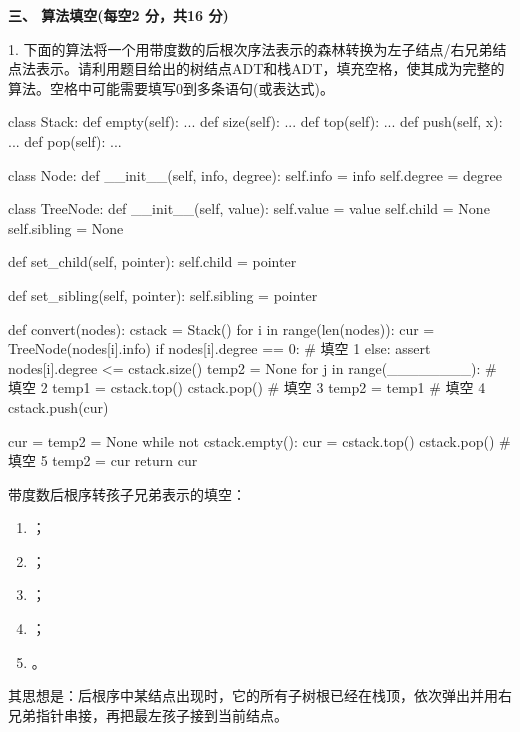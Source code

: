 \textbf{三、 算法填空(每空2 分，共16 分)}
\begin{question}
1. 下面的算法将一个用带度数的后根次序法表示的森林转换为左子结点/右兄弟结点法表示。请利用题目给出的树结点ADT和栈ADT，填充空格，使其成为完整的算法。空格中可能需要填写0到多条语句(或表达式)。
\begin{pycode}
class Stack:
    def empty(self): ...
    def size(self): ...
    def top(self): ...
    def push(self, x): ...
    def pop(self): ...


class Node:
    def __init__(self, info, degree):
        self.info = info
        self.degree = degree


class TreeNode:
    def __init__(self, value):
        self.value = value
        self.child = None
        self.sibling = None

    def set_child(self, pointer):
        self.child = pointer

    def set_sibling(self, pointer):
        self.sibling = pointer


def convert(nodes):
    cstack = Stack()
    for i in range(len(nodes)):
        cur = TreeNode(nodes[i].info)
        if nodes[i].degree == 0:
            # 填空 1
        else:
            assert nodes[i].degree <= cstack.size()
            temp2 = None
            for j in range(________):      # 填空 2
                temp1 = cstack.top()
                cstack.pop()
                # 填空 3
                temp2 = temp1
            # 填空 4
            cstack.push(cur)

    cur = temp2 = None
    while not cstack.empty():
        cur = cstack.top()
        cstack.pop()
        # 填空 5
        temp2 = cur
    return cur
\end{pycode}
\begin{solution}
带度数后根序转孩子兄弟表示的填空：
  \begin{enumerate}[leftmargin=2em]
    \item \texttt{}；
    \item \texttt{}；
    \item \texttt{}；
    \item \texttt{}；
    \item \texttt{}。
  \end{enumerate}
  其思想是：后根序中某结点出现时，它的所有子树根已经在栈顶，依次弹出并用右兄弟指针串接，再把最左孩子接到当前结点。
\end{solution}
\end{question}

